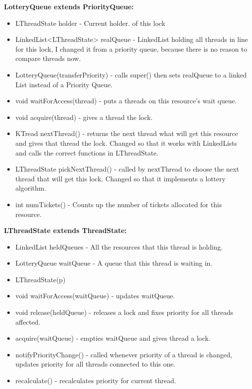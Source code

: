 \documentclass{article}
\begin{document}
\noindent\textbf{LotteryQueue extends PriorityQueue:} \begin{itemize}
\item {\ttfamily LThreadState holder} - Current holder. of this lock
\item {\ttfamily LinkedList<LThreadState> realQueue} - LinkedList holding all threads in line for this lock, I changed it from a priority queue, because there is no reason to compare threads now.
\item {\ttfamily LotteryQueue(transferPriority)} - calls super() then sets realQueue to a linked List instead of a Priority Queue.
\item {\ttfamily void waitForAccess(thread)} - puts a threads on this resource's wait queue.
\item {\ttfamily void acquire(thread)} - gives a thread the lock.
\item {\ttfamily KTread nextThread()} - returns the next thread what will get this resource and gives that thread the lock. Changed so that it works with LinkedLists and calls the correct functions in LThreadState.
\item {\ttfamily LThreadState pickNextThread()} - called by nextThread to choose the next thread that will get this lock. Changed so that it implements a lottery algorithm.
\item {\ttfamily int numTickets()} - Counts up the number of tickets allocated for this resource.
\end{itemize}

\noindent\textbf{LThreadState extends ThreadState:} \begin{itemize}
\item {\ttfamily LinkedList heldQueues}               - All the resources that this thread is holding.
\item {\ttfamily LotteryQueue waitQueue}              - A queue that this thread is waiting in.
\item {\ttfamily LThreadState(p)}                      
\item {\ttfamily void waitForAccess(waitQueue)}       - updates waitQueue.
\item {\ttfamily void release(heldQueue)}              - releases a lock and fixes priority for all threads affected.
\item {\ttfamily acquire(waitQueue)}                  - empties waitQueue and gives thread a lock.
\item {\ttfamily notifyPriorityChange()}              - called whenever priority of a thread is changed, updates priority for all threads connected to this one.
\item {\ttfamily recalculate()}                       - recalculates priority for current thread.
\end{itemize}
\end{document}
